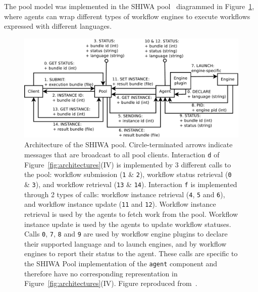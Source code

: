 \documentclass[preprint,3p,twocolumn]{elsarticle}
\newcommand{\note}[2]{\pdfmargincomment[color=yellow,author=#1,open=true]{#2}}
\newcommand{\closednote}[4]{} %
\begin{document}
The pool model was implemented in the SHIWA pool~\cite{ROGE-13}
diagrammed in Figure~\ref{fig:shiwa-pool-architecture}, where agents
can wrap different types of workflow engines to execute workflows
expressed with different languages.



\begin{figure}
\centering
\includegraphics[width=1.5\columnwidth]{figures/pool-interactions.pdf}
\caption{Architecture of the SHIWA pool. Circle-terminated arrows
  indicate messages that are broadcast to all pool
  clients. Interaction \texttt{d} of Figure~\ref{fig:architectures}(IV) is
  implemented by 3 different calls to the pool: workflow
  submission (\texttt{1} \& \texttt{2}), workflow status retrieval
  (\texttt{0} \& \texttt{3})\closednote{sorina}{I suppose letters come
    here from the initial pool-model figure; it's a bit puzzling when
    mixed with letters from Fig 2}{Tristan}{Fixed.}, and workflow
  retrieval (\texttt{13} \& \texttt{14}). \closednote{Marc-e}{Maybe
    easier to follow if the following would be in fig legend instead
    of here, as for 2 previous figures}{Tristan}{fixed} Interaction
  \texttt{f} is implemented through 2 types of calls: workflow
  instance retrieval (\texttt{4}, \texttt{5} and \texttt{6}), and
  workflow instance update (\texttt{11} and \texttt{12}). Workflow
  instance retrieval is used by the agents to fetch work from the
  pool. Workflow instance update is used by the agents to update
  workflow statuses.  Calls \texttt{0}, \texttt{7}, \texttt{8} and
  \texttt{9} are used by
  workflow engine plugins to declare their supported language and to
  launch engines, and by workflow engines to report their status to
  the agent. These calls are specific to the SHIWA Pool implementation
  of the \texttt{agent} component and therefore have no corresponding
  representation in Figure~\ref{fig:architectures}(IV). Figure reproduced
  from~\cite{ROGE-13}.}
\label{fig:shiwa-pool-architecture}
\end{figure}
\end{document}

